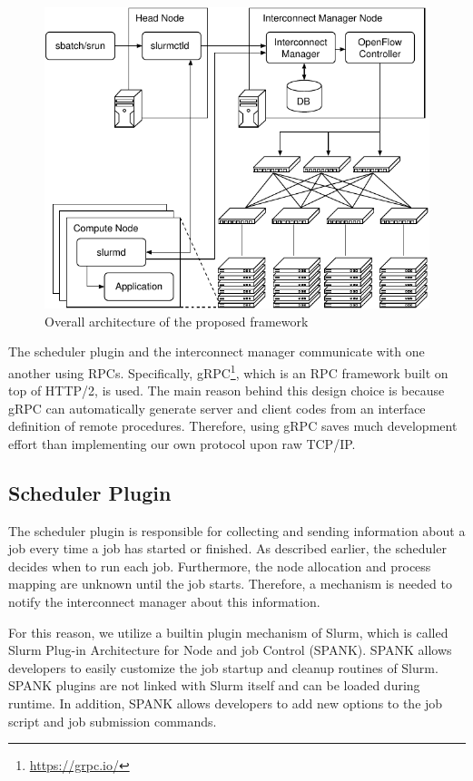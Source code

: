 \documentclass[graybox]{svmult}
\begin{document}
\begin{figure}
    \centering
    \includegraphics{architecture}
    \caption{Overall architecture of the proposed framework}%
    \label{kt:fig:architecture}
\end{figure}

The scheduler plugin and the interconnect manager communicate with
one another using RPCs. Specifically, gRPC\footnote{\url{https://grpc.io/}}, which is an
RPC framework built on top of HTTP/2, is used. The main reason behind this
design choice is because gRPC can automatically generate server and client
codes from an interface definition of remote procedures. Therefore, using gRPC
saves much development effort than implementing our own protocol upon raw
TCP/IP\@.

\subsection{Scheduler Plugin}

The scheduler plugin is responsible for collecting and sending information
about a job every time a job has started or finished. As described earlier,
the scheduler decides when to run each job. Furthermore, the node allocation
and process mapping are unknown until the job starts. Therefore, a mechanism
is needed to notify the interconnect manager about this information.

For this reason, we utilize a builtin plugin mechanism of Slurm, which is
called Slurm Plug-in Architecture for Node and job Control (SPANK). SPANK
allows developers to easily customize the job startup and cleanup routines of
Slurm. SPANK plugins are not linked with Slurm itself and can be loaded during
runtime. In addition, SPANK allows developers to add new options to the job
script and job submission commands.
\end{document}
